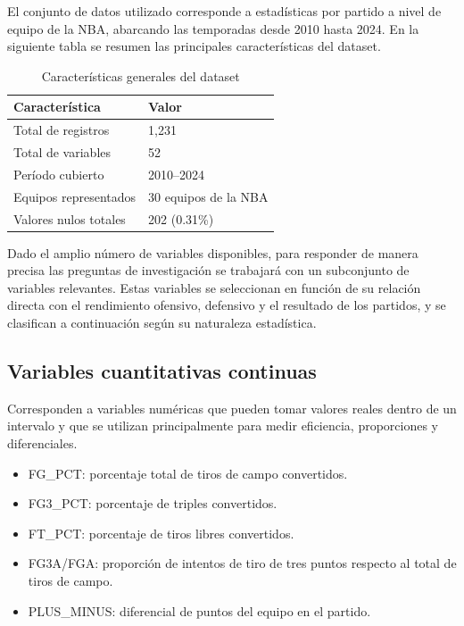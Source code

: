 \documentclass[12pt]{article}
\begin{document}
El conjunto de datos utilizado corresponde a estadísticas por partido a nivel de equipo
de la NBA, abarcando las temporadas desde 2010 hasta 2024. En la siguiente tabla se resumen
las principales características del dataset.

\begin{table}[H]
\centering
\begin{tabular}{@{}ll@{}}
\toprule
\textbf{Característica} & \textbf{Valor} \\ \midrule
Total de registros & 1,231 \\
Total de variables & 52 \\
Período cubierto & 2010--2024 \\
Equipos representados & 30 equipos de la NBA \\
Valores nulos totales & 202 (0.31\%) \\ \bottomrule
\end{tabular}
\caption{Características generales del dataset}
\end{table}

\vspace{0.3cm}

Dado el amplio número de variables disponibles, para responder de manera precisa
las preguntas de investigación se trabajará con un subconjunto de variables relevantes.
Estas variables se seleccionan en función de su relación directa con el rendimiento ofensivo,
defensivo y el resultado de los partidos, y se clasifican a continuación según su naturaleza
estadística.

\subsection*{Variables cuantitativas continuas}
Corresponden a variables numéricas que pueden tomar valores reales dentro de un intervalo y que se utilizan principalmente para medir eficiencia, proporciones y diferenciales.

\begin{itemize}
    \item FG\_PCT: porcentaje total de tiros de campo convertidos.
    \item FG3\_PCT: porcentaje de triples convertidos.
    \item FT\_PCT: porcentaje de tiros libres convertidos.
    \item FG3A/FGA: proporción de intentos de tiro de tres puntos respecto al total de tiros de campo.
    \item PLUS\_MINUS: diferencial de puntos del equipo en el partido.
\end{itemize}
\end{document}
